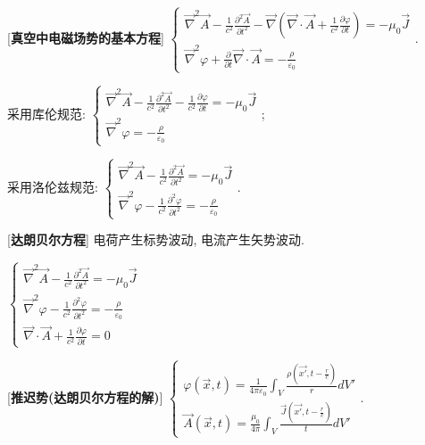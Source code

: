 [\textbf{真空中电磁场势的基本方程}] $\begin{cases}\vec\nabla^2\vec A-\frac{1}{c^2}\frac{\partial^2\vec A}{\partial t^2}-\vec\nabla(\vec\nabla\cdot\vec A+\frac{1}{c^2}\frac{\partial\varphi}{\partial t})=-\mu_0\vec J\\\vec\nabla^2\varphi+\frac{\partial}{\partial t}\vec\nabla\cdot\vec A=-\frac{\rho}{\varepsilon_0}\end{cases}$.\par
\qquad 采用库伦规范: $\begin{cases}\vec\nabla^2\vec A-\frac{1}{c^2}\frac{\partial^2\vec A}{\partial t^2}-\frac{1}{c^2}\frac{\partial \varphi}{\partial t}=-\mu_0\vec J\\\vec\nabla^2\varphi=-\frac{\rho}{\varepsilon_0}\end{cases}$;\par
\qquad 采用洛伦兹规范: $\begin{cases}\vec\nabla^2\vec A-\frac{1}{c^2}\frac{\partial^2\vec A}{\partial t^2}=-\mu_0\vec J\\\vec\nabla^2\varphi-\frac{1}{c^2}\frac{\partial^2\varphi}{\partial t^2}=-\frac{\rho}{\varepsilon_0}\end{cases}$.\par

[\textbf{达朗贝尔方程}] 电荷产生标势波动, 电流产生矢势波动.\par
\qquad $\begin{cases}\vec\nabla^2\vec A-\frac{1}{c^2}\frac{\partial^2\vec A}{\partial t^2}=-\mu_0\vec J\\\vec\nabla^2\varphi-\frac{1}{c^2}\frac{\partial^2\varphi}{\partial t^2}=-\frac{\rho}{\varepsilon_0}\\\vec\nabla\cdot\vec A+\frac{1}{c^2}\frac{\partial \varphi}{\partial t}=0\end{cases}$\par

[\textbf{推迟势(达朗贝尔方程的解)}] $\begin{cases}\varphi(\vec x,t)=\frac{1}{4\pi\varepsilon_0}\int_V\frac{\rho(\vec{x'},t-\frac{r}{c})}{r}dV'\\\vec A(\vec x,t)=\frac{\mu_0}{4\pi}\int_V\frac{\vec J(\vec{x'}, t-\frac{r}{c})}{t}dV'\end{cases}$.\par

\clearpage

